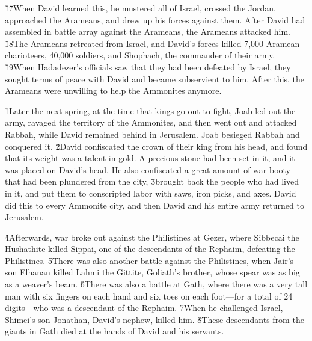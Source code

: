 \v{17}When David learned this, he mustered all of Israel, crossed the Jordan, approached the Arameans, and drew up his forces against them. After David had assembled in battle array against the Arameans, the Arameans attacked him. \v{18}The Arameans retreated from Israel, and David's forces killed 7,000 Aramean charioteers, 40,000 soldiers, and Shophach, the commander of their army. \v{19}When Hadadezer's officials saw that they had been defeated by Israel, they sought terms of peace with David and became subservient to him. After this, the Arameans were unwilling to help the Ammonites anymore.

\v{1}Later the next spring, at the time that kings go out to fight, Joab led out the army, ravaged the territory of the Ammonites, and then went out and attacked Rabbah, while David remained behind in Jerusalem. Joab besieged Rabbah and conquered it. \v{2}David confiscated the crown of their king from his head, and found that its weight was a talent in gold. A precious stone had been set in it, and it was placed on David's head. He also confiscated a great amount of war booty that had been plundered from the city, \v{3}brought back the people who had lived in it, and put them to conscripted labor with saws, iron picks, and axes. David did this to every Ammonite city, and then David and his entire army returned to Jerusalem.

\v{4}Afterwards, war broke out against the Philistines at Gezer, where Sibbecai the Hushathite killed Sippai, one of the descendants of the Rephaim, defeating the Philistines. \v{5}There was also another battle against the Philistines, when Jair's son Elhanan killed Lahmi the Gittite, Goliath's brother, whose spear was as big as a weaver's beam. \v{6}There was also a battle at Gath, where there was a very tall man with six fingers on each hand and six toes on each foot---for a total of 24 digits---who was a descendant of the Rephaim. \v{7}When he challenged Israel, Shimei's son Jonathan, David's nephew, killed him. \v{8}These descendants from the giants in Gath died at the hands of David and his servants.

